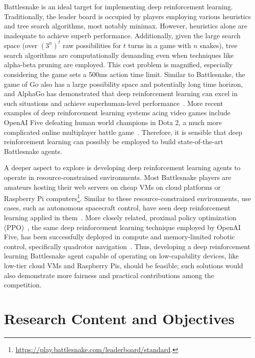 \documentclass[a4paper]{article}
\begin{document}
Battlesnake is an ideal target for implementing deep reinforcement learning.
Traditionally,
the leader board is occupied by players employing various heuristics and tree
search algorithms, most notably minimax. %
However, heuristics alone are inadequate to achieve superb performance. %
Additionally,
given the large search space (over $(3^n)^t$ raw possibilities for $t$ turns in
a game with $n$ snakes),
tree search algorithms are computationally demanding even when techniques like
alpha-beta pruning are employed. This cost problem is magnified,
especially considering the game sets a 500ms action time limit.
Similar to Battlesnake,
the game of Go also has a large possibility space and potentially long time
horizon,
and AlphaGo has demonstrated that deep reinforcement learning can excel in such
situations and achieve superhuman-level performance~\cite{silver2016mastering}.
More recent examples of deep reinforcement learning systems acing video games include
OpenAI Five defeating human world champions in Dota 2,
a much more complicated online multiplayer battle game~\cite{berner2019dota}.
Therefore,
it is sensible that deep reinforcement learning can possibly be employed to build
state-of-the-art Battlesnake agents.

A deeper aspect to explore is developing deep reinforcement learning agents to
operate in resource-constrained environments.
Most Battlesnake players are amateurs hosting their web servers on cheap VMs on
cloud platforms or Raspberry Pi
computers\footnote{\url{https://play.battlesnake.com/leaderboard/standard}.}.
Similar to these resource-constrained environments, use cases,
such as autonomous spacecraft control,
have seen deep reinforcement learning applied in
them~\cite{harris2022generation}. More closely related,
proximal policy optimization (PPO)~\cite{schulman2017proximal},
the same deep reinforcement learning technique employed by OpenAI Five,
has been successfully deployed in compute and memory-limited robotic control,
specifically quadrotor navigation~\cite{huang2023collision,hegde2023hyperppo}.
Thus,
developing a deep reinforcement learning Battlesnake agent capable of operating
on low-capability devices,
like low-tier cloud VMs and Raspberry Pis, should be feasible;
such solutions would also demonstrate more fairness and practical contributions
among the competition.

\section{Research Content and Objectives}
\end{document}
